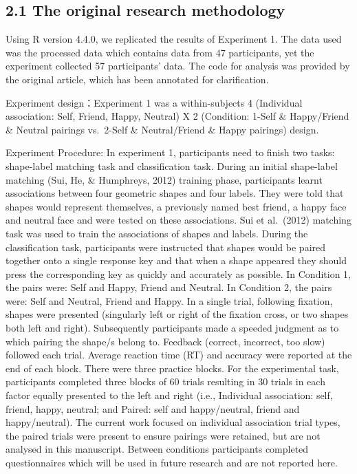 \documentclass[
  man]{apa6}
\begin{document}
\subsection{2.1 The original research methodology}\label{the-original-research-methodology}

Using R version 4.4.0, we replicated the results of Experiment 1. The data used was the processed data which contains data from 47 participants, yet the experiment collected 57 participants' data. The code for analysis was provided by the original article, which has been annotated for clarification.

Experiment design：Experiment 1 was a within-subjects 4 (Individual association: Self, Friend, Happy, Neutral) X 2 (Condition: 1-Self \& Happy/Friend \& Neutral pairings vs.~2-Self \& Neutral/Friend \& Happy pairings) design.

Experiment Procedure: In experiment 1, participants need to finish two tasks: shape-label matching task and classification task. During an initial shape-label matching (Sui, He, \& Humphreys, 2012) training phase, participants learnt associations between four geometric shapes and four labels. They were told that shapes would represent themselves, a previously named best friend, a happy face and neutral face and were tested on these associations. Sui et al.~(2012) matching task was used to train the associations of shapes and labels. During the classification task, participants were instructed that shapes would be paired together onto a single response key and that when a shape appeared they should press the corresponding key as quickly and accurately as possible. In Condition 1, the pairs were: Self and Happy, Friend and Neutral. In Condition 2, the pairs were: Self and Neutral, Friend and Happy. In a single trial, following fixation, shapes were presented (singularly left or right of the fixation cross, or two shapes both left and right). Subsequently participants made a speeded judgment as to which pairing the shape/s belong to. Feedback (correct, incorrect, too slow) followed each trial. Average reaction time (RT) and accuracy were reported at the end of each block. There were three practice blocks. For the experimental task, participants completed three blocks of 60 trials resulting in 30 trials in each factor equally presented to the left and right (i.e., Individual association: self, friend, happy, neutral; and Paired: self and happy/neutral, friend and happy/neutral). The current work focused on individual association trial types, the paired trials were present to ensure pairings were retained, but are not analysed in this manuscript. Between conditions participants completed questionnaires which will be used in future research and are not reported here.
\end{document}
